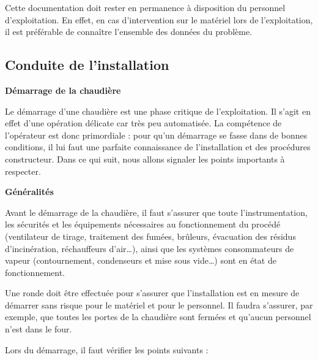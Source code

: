 Cette documentation doit rester en permanence à disposition du personnel d’exploitation. En effet, en cas d’intervention sur le matériel lors de l’exploitation, il est préférable de connaître l’ensemble des données du problème.

 
\subsection{Conduite de l’installation}

\textbf{Démarrage de la chaudière}
\vspace{0.3cm} 

Le démarrage d’une chaudière est une phase critique de l’exploitation. Il s’agit en effet d’une opération délicate car très peu automatisée. La compétence de l’opérateur est donc primordiale : pour qu’un démarrage se fasse dans de bonnes conditions, il lui faut une parfaite connaissance de l’installation et des procédures constructeur.
Dans ce qui suit, nous allons signaler les points importants à respecter.



\vspace{0.3cm}
\textbf{Généralités}
\vspace{0.3cm}

Avant le démarrage de la chaudière, il faut s’assurer que toute l’instrumentation, les sécurités et les équipements nécessaires au fonctionnement du procédé (ventilateur de tirage, traitement des fumées, brûleurs, évacuation des résidus d’incinération, réchauffeurs d’air…), ainsi que les systèmes consommateurs de vapeur (contournement, condenseurs et mise sous vide…) sont en état de fonctionnement.
\vspace{0.3cm}

Une ronde doit être effectuée pour s’assurer que l’installation est en mesure de démarrer sans risque pour le matériel et pour le personnel. Il faudra s’assurer, par exemple, que toutes les portes de la chaudière sont fermées et qu’aucun personnel n’est dans le four.

Lors du démarrage, il faut vérifier les points suivants :

